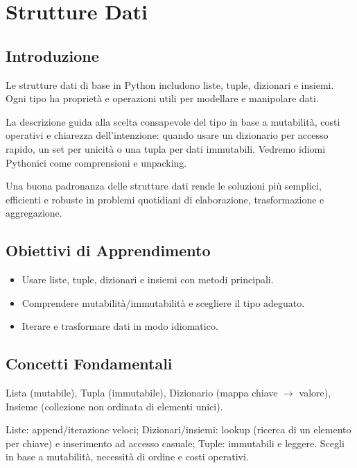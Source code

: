 \chapter{Strutture Dati}

\section{Introduzione}
Le strutture dati di base in Python includono liste, tuple, dizionari e insiemi. Ogni tipo ha proprietà e operazioni utili per modellare e manipolare dati.

La descrizione guida alla scelta consapevole del tipo in base a mutabilità, costi operativi e chiarezza dell'intenzione: quando usare un dizionario per accesso rapido, un set per unicità o una tupla per dati immutabili. Vedremo idiomi Pythonici come comprensioni e unpacking.

Una buona padronanza delle strutture dati rende le soluzioni più semplici, efficienti e robuste in problemi quotidiani di elaborazione, trasformazione e aggregazione.

\section{Obiettivi di Apprendimento}
\begin{itemize}
  \item Usare liste, tuple, dizionari e insiemi con metodi principali.
  \item Comprendere mutabilità/immutabilità e scegliere il tipo adeguato.
  \item Iterare e trasformare dati in modo idiomatico.
\end{itemize}

\section{Concetti Fondamentali}
\begin{tcolorbox}[title=Panoramica]
Lista (mutabile), Tupla (immutabile), Dizionario (mappa chiave $\rightarrow$ valore), Insieme (collezione non ordinata di elementi unici).
\end{tcolorbox}

\begin{tcolorbox}[title=Complessità e prestazioni]
Liste: append/iterazione veloci; Dizionari/insiemi: lookup (ricerca di un elemento per chiave) e inserimento ad accesso casuale; Tuple: immutabili e leggere. Scegli in base a mutabilità, necessità di ordine e costi operativi.
\end{tcolorbox}

